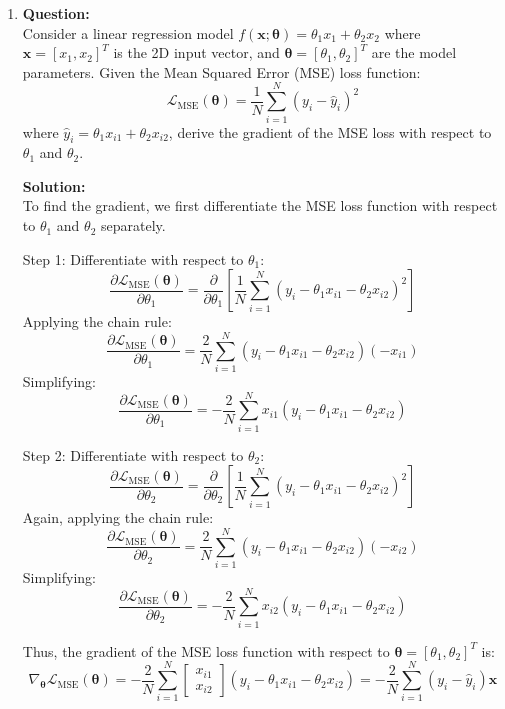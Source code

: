 \documentclass{article}
\begin{document}
\begin{enumerate}

\item \textbf{Question:} \\
Consider a linear regression model \( f(\mathbf{x}; \mathbf{\theta}) = \theta_1 x_1 + \theta_2 x_2 \) where \(\mathbf{x} = [x_1, x_2]^T\) is the 2D input vector, and \(\mathbf{\theta} = [\theta_1, \theta_2]^T\) are the model parameters. Given the Mean Squared Error (MSE) loss function:
\[
\mathcal{L}_{\text{MSE}}(\mathbf{\theta}) = \frac{1}{N} \sum_{i=1}^{N} \left( y_i - \hat{y}_i \right)^2
\]
where $\hat{y}_i=\theta_1 x_{i1} + \theta_2 x_{i2}$, derive the gradient of the MSE loss with respect to \(\theta_1\) and \(\theta_2\).

\textbf{Solution:}\\
To find the gradient, we first differentiate the MSE loss function with respect to \(\theta_1\) and \(\theta_2\) separately.

Step 1: Differentiate with respect to \(\theta_1\):
\[
\frac{\partial \mathcal{L}_{\text{MSE}}(\mathbf{\theta})}{\partial \theta_1} = \frac{\partial}{\partial \theta_1} \left[ \frac{1}{N} \sum_{i=1}^{N} \left( y_i - \theta_1 x_{i1} - \theta_2 x_{i2} \right)^2 \right]
\]
Applying the chain rule:
\[
\frac{\partial \mathcal{L}_{\text{MSE}}(\mathbf{\theta})}{\partial \theta_1} = \frac{2}{N} \sum_{i=1}^{N} \left( y_i - \theta_1 x_{i1} - \theta_2 x_{i2} \right) (-x_{i1})
\]
Simplifying:
\[
\frac{\partial \mathcal{L}_{\text{MSE}}(\mathbf{\theta})}{\partial \theta_1} = -\frac{2}{N} \sum_{i=1}^{N} x_{i1} \left( y_i - \theta_1 x_{i1} - \theta_2 x_{i2} \right)
\]

Step 2: Differentiate with respect to \(\theta_2\):
\[
\frac{\partial \mathcal{L}_{\text{MSE}}(\mathbf{\theta})}{\partial \theta_2} = \frac{\partial}{\partial \theta_2} \left[ \frac{1}{N} \sum_{i=1}^{N} \left( y_i - \theta_1 x_{i1} - \theta_2 x_{i2} \right)^2 \right]
\]
Again, applying the chain rule:
\[
\frac{\partial \mathcal{L}_{\text{MSE}}(\mathbf{\theta})}{\partial \theta_2} = \frac{2}{N} \sum_{i=1}^{N} \left( y_i - \theta_1 x_{i1} - \theta_2 x_{i2} \right) (-x_{i2})
\]
Simplifying:
\[
\frac{\partial \mathcal{L}_{\text{MSE}}(\mathbf{\theta})}{\partial \theta_2} = -\frac{2}{N} \sum_{i=1}^{N} x_{i2} \left( y_i - \theta_1 x_{i1} - \theta_2 x_{i2} \right)
\]

Thus, the gradient of the MSE loss function with respect to \(\mathbf{\theta} = [\theta_1, \theta_2]^T\) is:
\[
\nabla_{\mathbf{\theta}} \mathcal{L}_{\text{MSE}}(\mathbf{\theta}) = -\frac{2}{N} \sum_{i=1}^{N} \begin{bmatrix} x_{i1} \\ x_{i2} \end{bmatrix} \left( y_i - \theta_1 x_{i1} - \theta_2 x_{i2} \right) = -\frac{2}{N} \sum_{i=1}^{N} \left( y_i - \hat{y}_i \right) \mathbf{x}
\]


\end{enumerate}
\end{document}
